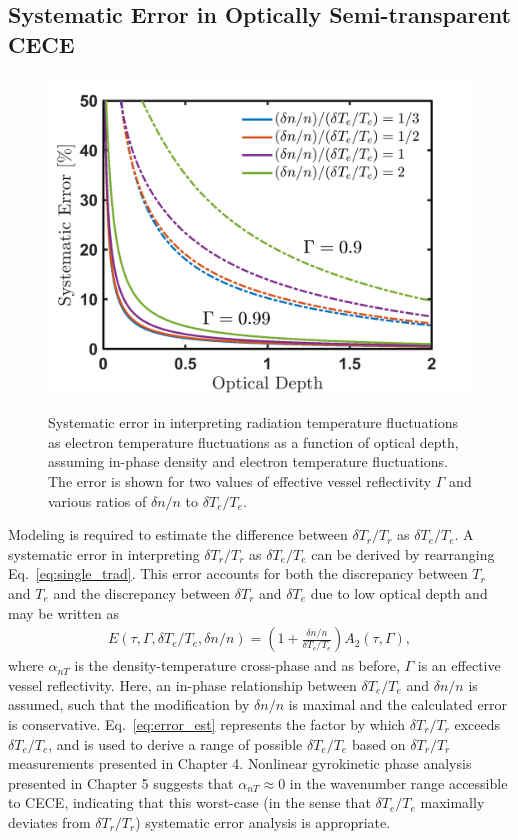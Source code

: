 \documentclass[%
 aip,
 amsmath,amssymb,
 reprint,%
]{revtex4-1}
\begin{document}

\subsection{Systematic Error in Optically Semi-transparent CECE} \label{sec:sys_error}

\begin{figure}[!htbp]
\centering
{\includegraphics[width=.45\textwidth]{Figures/ratio_scan.png}}

\caption{Systematic error in interpreting radiation temperature fluctuations as electron temperature fluctuations as a function of optical depth, assuming in-phase density and electron temperature fluctuations. The error is shown for two values of effective vessel reflectivity $\Gamma$ and various ratios of $\delta n / n$ to $\delta T_e / T_e$. }
\label{fig:sys_error_ratio_scan}

\end{figure}  

Modeling is required to estimate the difference between $\delta T_r/T_r$ as $\delta T_e/T_e$. A systematic error in interpreting $\delta T_r/T_r$ as $\delta T_e/T_e$ can be derived by rearranging Eq.\ \eqref{eq:single_trad}. This error accounts for both the discrepancy between $T_r$ and $T_e$ and the discrepancy between $\delta T_r$ and $\delta T_e$ due to low optical depth and may be written as
\begin{align}
	E(\tau,\Gamma,\delta T_e/T_e, \delta n/n) = \left(1 + \frac{\delta n / n}{\delta T_e / T_e} \right) A_2(\tau,\Gamma),  \label{eq:error_est}
\end{align}
where $\alpha_{nT}$ is the density-temperature cross-phase and as before, $\Gamma$ is an effective vessel reflectivity. Here, an in-phase relationship between $\delta T_e/T_e$ and $\delta n/n$ is assumed, such that the modification by $\delta n/n$ is maximal and the calculated error is conservative. Eq.\ \eqref{eq:error_est} represents the factor by which $\delta T_r/T_r$ exceeds $\delta T_e/T_e$, and is used to derive a range of possible $\delta T_e/T_e$ based on $\delta T_r/T_r$ measurements presented in Chapter 4. Nonlinear gyrokinetic phase analysis presented in Chapter 5 suggests that $\alpha_{nT}\approx0$ in the wavenumber range accessible to CECE, indicating that this worst-case (in the sense that $\delta T_e/T_e$ maximally deviates from $\delta T_r/T_r$) systematic error analysis is appropriate.
\end{document}
